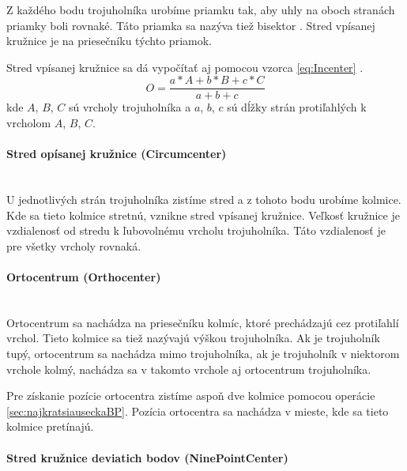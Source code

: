 Z každého bodu trojuholníka urobíme priamku tak, aby uhly na oboch stranách priam\-ky boli rovnaké. Táto priamka sa nazýva tiež bisektor \cite{https://www.tutorvista.com/math/angle-bisector-theorem}. Stred vpísanej kružnice je na priesečníku týchto priamok.




Stred vpísanej kružnice sa dá vypočítať aj pomocou vzorca \ref{eq:Incenter} \cite{https://www.mathopenref.com/coordincenter.html}.
\begin{equation}
O = \frac{a\ast A+b\ast  B +c \ast C}{a + b + c}
    \label{eq:Incenter}
\end{equation}
kde  $A$, $B$, $C$ sú vrcholy trojuholníka a $a$, $b$, $c$ sú dĺžky strán protiľahlých k vrcholom $A$, $B$, $C$.

\paragraph{Stred opísanej kružnice (Circumcenter)}\mbox{} \\

U jednotlivých strán trojuholníka zistíme stred a z tohoto bodu urobíme kolmice. Kde sa tieto kolmice stretnú, vznikne stred vpísanej kružnice. Veľkosť kružnice je vzdialenosť od stredu k ľubovolnému vrcholu trojuholníka. Táto vzdialenosť je pre všetky vrcholy rovnaká.


\paragraph{Ortocentrum (Orthocenter)}\mbox{} \\

Ortocentrum sa nachádza na priesečníku kolmíc, ktoré prechádzajú cez protiľahlí vrchol. Tieto kolmice sa tiež nazývajú výškou trojuholníka. 
Ak je trojuholník tupý, ortocentrum sa nachádza mimo trojuholníka, ak je trojuholník v niektorom vrchole kolmý, nachádza sa v takomto vrchole aj ortocentrum trojuholníka.

Pre získanie pozície ortocentra zistíme aspoň dve kolmice pomocou operácie \ref{sec:najkratsiauseckaBP}. Pozícia ortocentra sa nachádza v mieste, kde sa tieto kolmice pretínajú. 


\paragraph{Stred kružnice deviatich bodov (NinePointCenter)}\mbox{} \\

